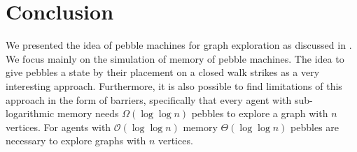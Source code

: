 \section{Conclusion}
We presented the idea of pebble machines for graph exploration
as discussed in \cite{pebbles}. We focus mainly on the simulation of
memory of pebble machines. The idea to give pebbles a state by their placement
on a closed walk strikes as a very interesting approach. Furthermore, it is
also possible to find limitations of this approach in the form of barriers,
specifically that every agent with sub-logarithmic memory needs
$\Omega(\log\log n)$ pebbles to explore a graph with $n$ vertices. For agents
with $\mathcal{O}(\log\log n)$ memory $\Theta(\log\log n)$ pebbles are
necessary to explore graphs with $n$ vertices.

\printbibliography

